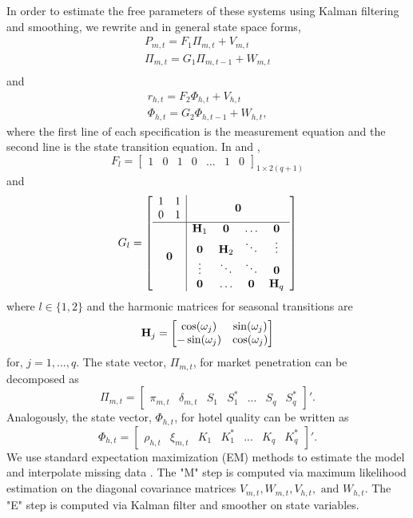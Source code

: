 \documentclass{informs_mod} %
\begin{document}
In order to estimate the free parameters of these systems using Kalman filtering and smoothing, we rewrite  and  in general state space forms,
\begin{equation}\label{eq:penetration_dlm_ssm}
\begin{split}
P_{m,t} = F_1\Pi_{m,t}+V_{m,t} \\
\Pi_{m,t} = G_1\Pi_{m,t-1}+W_{m,t} \\
\end{split}
\end{equation}
and
\begin{equation}\label{eq:ratings_dlm_ssm}
\begin{split}
r_{h,t} = F_2\Phi_{h,t}+V_{h,t} \\
\Phi_{h,t} = G_2\Phi_{h,t-1}+W_{h,t},
\end{split}
\end{equation}
where the first line of each specification is the measurement equation and the second line is the state transition equation. In  and , 
$$
F_l=\begin{bmatrix}
1 & 0 & 1 & 0 &...& 1 & 0
\end{bmatrix}_{1\times 2(q+1)}
$$ and 
$$
G_l=
\left[
\begin{array}{c|c}
\begin{matrix}
1&1\\		
0&1
\end{matrix}& \bold{0} \\
\hline
\bold{0} & \begin{matrix}
\bold{H}_1 & \bold{0} & \dots& \bold{0} \\
\bold{0} & \bold{H}_2 & \ddots & \vdots \\
\vdots &\ddots & \ddots & \bold{0} \\
\bold{0} &\dots & \bold{0} & \bold{H}_q
\end{matrix}
\end{array}
\right]
$$
where $l\in \{ 1, 2 \}$ and the harmonic matrices for seasonal transitions are
$$
\bold{H}_j=
\begin{bmatrix}
\cos(\omega_j) & \sin(\omega_j) \\
-\sin(\omega_j) & \cos(\omega_j)
\end{bmatrix}
$$
for, $j=1,...,q$. The state vector, $\Pi_{m,t}$, for market penetration can be decomposed as 
$$
\Pi_{m,t} = \begin{bmatrix}
\pi_{m, t} & \delta_{m,t} & S_1 & S_1^{*} & ... & S_q&S_q^{*}
\end{bmatrix}'.
$$
Analogously, the state vector, $\Phi_{h,t}$, for hotel quality can be written as
$$
\Phi_{h,t} = \begin{bmatrix}
\rho_{h, t} & \xi_{m,t} & K_1 & K_1^{*} & ... & K_q&K_q^{*}
\end{bmatrix}'.
$$
We use standard expectation maximization (EM) methods to estimate the model and interpolate missing data . The "M" step is computed via maximum likelihood estimation on the diagonal covariance matrices $V_{m,t}, W_{m,t}, V_{h,t}, \text{ and }W_{h,t}$. The "E" step is computed via Kalman filter and smoother on state variables.
\end{document}
